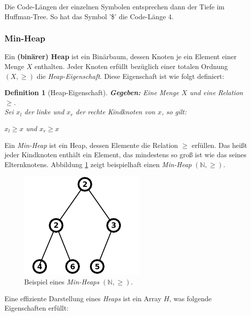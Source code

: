 \documentclass[a4paper,11pt]{scrartcl}%
\theoremstyle{change}
\theoremstyle{nonumberplain}
\theoremstyle{change}
\newtheorem{definition}[theorem]{Definition}
\theoremstyle{nonumberplain}
\theoremstyle{change}
\theoremstyle{nonumberplain}
\begin{document}
Die Code-Längen der einzelnen Symbolen entsprechen dann der Tiefe im Huffman-Tree. So hat das Symbol '\$' die Code-Länge 4.


\subsubsection{Min-Heap}\label{min-heap}

Ein \textbf{(binärer) Heap} ist ein Binärbaum, dessen Knoten je ein Element einer Menge $X$ enthalten. Jeder Knoten erfüllt bezüglich einer totalen Ordnung $(X,\geq)$ die \textit{Heap-Eigenschaft}. Diese Eigenschaft ist wie folgt definiert:

\begin{definition} [Heap-Eigenschaft]
	\textbf{Gegeben:} Eine Menge $X$ und eine Relation $\geq$.\\
	Sei $x_{l}$ der linke und $x_{r}$ der rechte Kindknoten von $x$, so gilt:\\
	\begin{center}{$x_{l} \geq x$ und $x_{r} \geq x$}\end{center}
	 
\end{definition}

Ein \textit{Min-Heap} ist ein Heap, dessen Elemente die Relation $\geq$ erfüllen. Das heißt jeder Kindknoten enthält ein Element, das mindestens so groß ist wie das seines Elternknotens. Abbildung \ref{fig:min_heap_example} zeigt beispielhaft einen \textit{Min-Heap} $(\mathbb{N}, \geq )$.

\begin{figure}[h]
	    \centering
		\includegraphics[scale=0.9]{./pics/min_heap_example}
		 \caption{Beispiel eines \textit{Min-Heaps} $(\mathbb{N}, \geq )$.}
		 \label{fig:min_heap_example}
\end{figure}

Eine effiziente Darstellung eines \textit{Heaps} ist ein Array $H$, was folgende Eigenschaften erfüllt:
\end{document}
